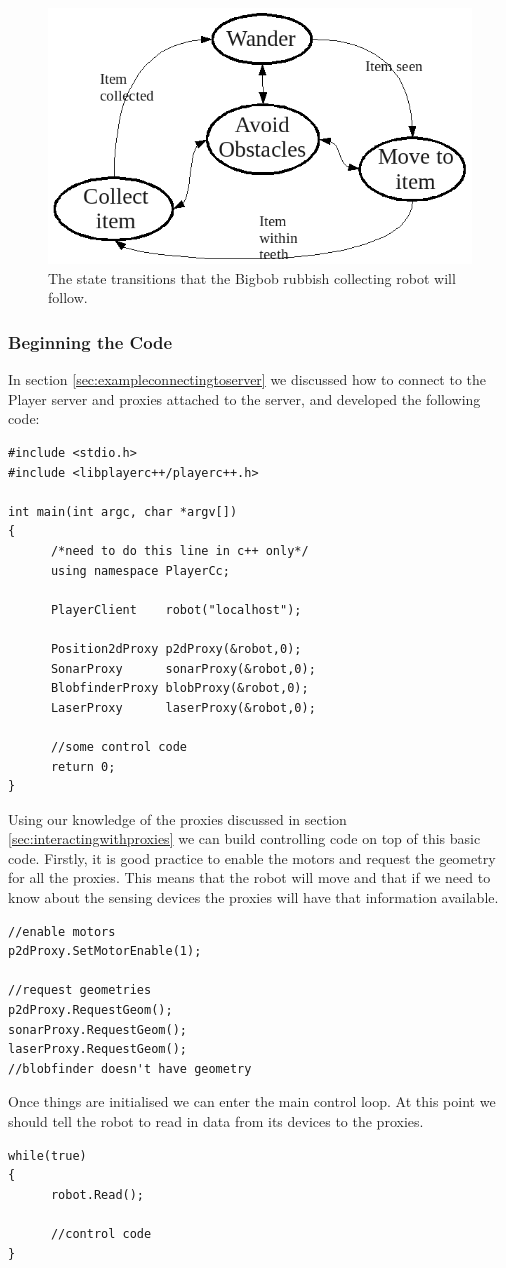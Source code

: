 \documentclass[a4paper]{article}
\newcommand{\pl}{Player\xspace}
\begin{document}
\begin{figure}
	\centering
	\includegraphics[width=\linewidth]{./pics/coding/arch_structureOA.png}
	\caption{The state transitions that the Bigbob rubbish collecting robot will follow.}
	\label{fig:archstructure}
\end{figure} 

\subsubsection{Beginning the Code}

In section \ref{sec:exampleconnectingtoserver} we discussed how to connect to the \pl server and proxies attached to the server, and developed the following code:
\begin{verbatim}
#include <stdio.h>
#include <libplayerc++/playerc++.h>

int main(int argc, char *argv[])
{
      /*need to do this line in c++ only*/
      using namespace PlayerCc;
	
      PlayerClient    robot("localhost");

      Position2dProxy p2dProxy(&robot,0);
      SonarProxy      sonarProxy(&robot,0);
      BlobfinderProxy blobProxy(&robot,0);
      LaserProxy      laserProxy(&robot,0);

      //some control code
      return 0;
}
\end{verbatim}
Using our knowledge of the proxies discussed in section \ref{sec:interactingwithproxies} we can build controlling code on top of this basic code. 
Firstly, it is good practice to enable the motors and request the geometry for all the proxies. This means that the robot will move and that if we need to know about the sensing devices the proxies will have that information available.
\begin{verbatim}
//enable motors
p2dProxy.SetMotorEnable(1);

//request geometries
p2dProxy.RequestGeom();
sonarProxy.RequestGeom();
laserProxy.RequestGeom();
//blobfinder doesn't have geometry
\end{verbatim}
Once things are initialised we can enter the main control loop. At this point we should tell the robot to read in data from its devices to the proxies.
\begin{verbatim}
while(true)
{
      robot.Read();

      //control code
}
\end{verbatim}
\end{document}

